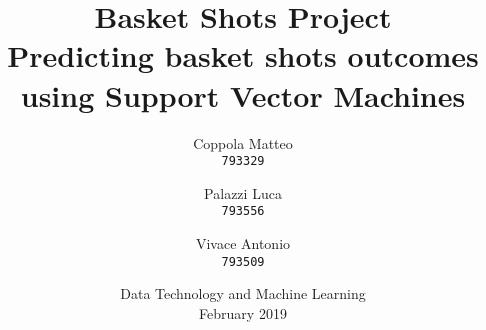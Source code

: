 \documentclass[12pt,a4paper]{report}
\begin{document}
\title{%
  \Huge Basket Shots Project\\
  \large Predicting basket shots outcomes using Support Vector Machines \\
    }
\author{
  Coppola Matteo\\
  \texttt{793329}
  \and
  Palazzi Luca\\
  \texttt{793556}
   \and
  Vivace Antonio\\
  \texttt{793509}
}
\date{Data Technology and Machine Learning \\ February 2019}
\maketitle

\tableofcontents
\end{document}
